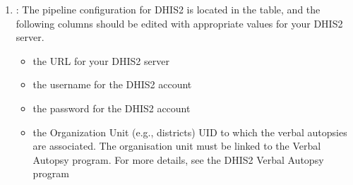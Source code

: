 \documentclass[letterpaper,12pt,english]{sphinxmanual}
\begin{document}
\begin{enumerate}
\begin{enumerate}
\begin{itemize}
\item {} 
 \textendash{} currently, there are only two acceptable values for the alogrithm are  or 

\item {} 
 \textendash{} this column captures the necessary inputs for producing a COD, namely the VA questionnaire, the
algorithm, and the symptom-cause information (SCI) (see {[}below{]}(\#SCI) for more information on the SCI).  Note that there are also
different versions (e.g., InterVA 4.01 and InterVA 4.02, or WHO 2012 questionnare and the WHO 2016 instrument/questionnaire).  It is
important to keep track of these inputs in order to make the COD determination reproducible and to fully understand the assignment
of the COD.  A list of all algorith metadata codes is provided in the  column in the  table.
The logic for each code is

algorith\textbar{}algorithm version\textbar{}SCI\textbar{}SCI version\textbar{}instrument\textbar{}instrument version

\item {} 
 \textendash{} both the InterVA and InSilicoVA algorithms return CODs from a list produced by the WHO, and thus this column should
be left at the default value of .

\end{itemize}

\item {} 
: The pipeline configuration for DHIS2 is located in the  table, and the following columns should
be edited with appropriate values for your DHIS2 server.
\begin{itemize}
\item {} 
 \textendash{}  the URL for your DHIS2 server

\item {} 
 \textendash{} the username for the DHIS2 account

\item {} 
 \textendash{} the password for the DHIS2 account

\item {} 
 \textendash{} the Organization Unit (e.g., districts) UID to which the verbal autopsies are associated. The organisation unit
must be linked to the Verbal Autopsy program.  For more details, see the DHIS2 Verbal Autopsy program

\end{itemize}

\end{enumerate}

\end{enumerate}
\end{document}
